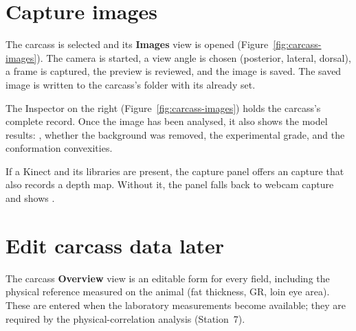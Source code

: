 \section{Capture images}

The carcass is selected and its \textbf{Images} view is opened
(Figure~\ref{fig:carcass-images}). The camera is started, a view angle is chosen
(posterior, lateral, dorsal), a frame is captured, the preview is reviewed, and
the image is saved. The saved image is written to the carcass's folder with its
 already set.


The Inspector on the right (Figure~\ref{fig:carcass-images}) holds the carcass's
complete record. Once the image has been analysed, it also shows the model
results: , whether the background was removed, the experimental
grade, and the conformation convexities.

\begin{note}[title={Kinect (RGB + depth), optional}]
If a Kinect and its libraries are present, the capture panel offers an
 capture that also records a depth map. Without it, the panel
falls back to webcam capture and shows .
\end{note}

\section{Edit carcass data later}

The carcass \textbf{Overview} view is an editable form for every field, including
the physical reference measured on the animal (fat thickness, GR, loin eye area).
These are entered when the laboratory measurements become available; they are
required by the physical-correlation analysis (Station~7).
